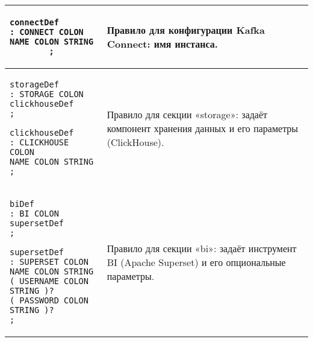 \begin{longtable}{|p{3in}|p{3in}|}
    \begin{minipage}{3in}
        \begin{verbatim}
connectDef
: CONNECT COLON 
NAME COLON STRING
        ;
    \end{verbatim}
    \end{minipage}
                                 &
    \begin{minipage}{2.6in}
        Правило для конфигурации Kafka Connect: имя инстанса.
    \end{minipage}
    \\ \hline

    \begin{minipage}{3in}
        \begin{verbatim}
storageDef
: STORAGE COLON 
clickhouseDef
;

clickhouseDef
: CLICKHOUSE COLON 
NAME COLON STRING
;
    \end{verbatim}
    \end{minipage}
                                 &
    \begin{minipage}{2.6in}
        Правило для секции «storage»: задаёт компонент хранения данных и его параметры (ClickHouse).
    \end{minipage}
    \\ \hline

    \begin{minipage}{3in}
        \begin{verbatim}
biDef
: BI COLON supersetDef
;

supersetDef
: SUPERSET COLON 
NAME COLON STRING
( USERNAME COLON STRING )?
( PASSWORD COLON STRING )?
;
    \end{verbatim}
    \end{minipage}
                                 &
    \begin{minipage}{2.6in}
        Правило для секции «bi»: задаёт инструмент BI (Apache Superset) и его опциональные параметры.
    \end{minipage}
    \\ \hline


\end{longtable}
